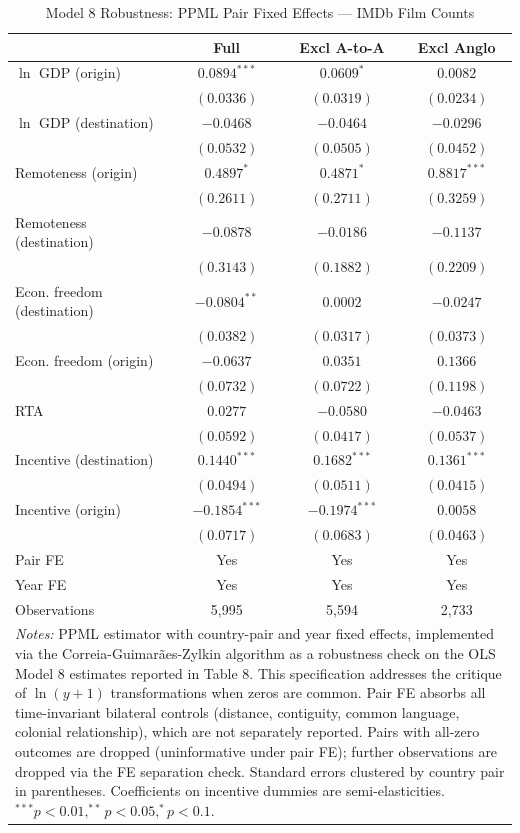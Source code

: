 \begin{table}[ht]
\centering\small
\caption{Model 8 Robustness: PPML Pair Fixed Effects --- IMDb Film Counts}
\label{tab:m8_ppml_robustness}
\begin{tabular}{lccc}
\hline\hline
 & Full & Excl A-to-A & Excl Anglo \\
\hline
$\ln$ GDP (origin) & $0.0894^{***}$ & $0.0609^{*}$ & $0.0082$ \\
 & $(0.0336)$ & $(0.0319)$ & $(0.0234)$ \\
$\ln$ GDP (destination) & $-0.0468$ & $-0.0464$ & $-0.0296$ \\
 & $(0.0532)$ & $(0.0505)$ & $(0.0452)$ \\
Remoteness (origin) & $0.4897^{*}$ & $0.4871^{*}$ & $0.8817^{***}$ \\
 & $(0.2611)$ & $(0.2711)$ & $(0.3259)$ \\
Remoteness (destination) & $-0.0878$ & $-0.0186$ & $-0.1137$ \\
 & $(0.3143)$ & $(0.1882)$ & $(0.2209)$ \\
Econ. freedom (destination) & $-0.0804^{**}$ & $0.0002$ & $-0.0247$ \\
 & $(0.0382)$ & $(0.0317)$ & $(0.0373)$ \\
Econ. freedom (origin) & $-0.0637$ & $0.0351$ & $0.1366$ \\
 & $(0.0732)$ & $(0.0722)$ & $(0.1198)$ \\
RTA & $0.0277$ & $-0.0580$ & $-0.0463$ \\
 & $(0.0592)$ & $(0.0417)$ & $(0.0537)$ \\
Incentive (destination) & $0.1440^{***}$ & $0.1682^{***}$ & $0.1361^{***}$ \\
 & $(0.0494)$ & $(0.0511)$ & $(0.0415)$ \\
Incentive (origin) & $-0.1854^{***}$ & $-0.1974^{***}$ & $0.0058$ \\
 & $(0.0717)$ & $(0.0683)$ & $(0.0463)$ \\
\hline
Pair FE & Yes & Yes & Yes \\
Year FE & Yes & Yes & Yes \\
Observations & 5,995 & 5,594 & 2,733 \\
\hline\hline
\multicolumn{4}{p{0.95\textwidth}}{\footnotesize 
\textit{Notes:} PPML estimator with country-pair and year fixed effects, 
implemented via the Correia-Guimar\~aes-Zylkin algorithm \citep{correia2020fast} 
as a robustness check on the OLS Model 8 estimates reported in Table 8. This 
specification addresses the \citet{chen2024logs} critique of $\ln(y+1)$ 
transformations when zeros are common. Pair FE absorbs all time-invariant 
bilateral controls (distance, contiguity, common language, colonial 
relationship), which are not separately reported. Pairs with all-zero outcomes 
are dropped (uninformative under pair FE); further observations are dropped via 
the FE separation check. Standard errors clustered by country pair in 
parentheses. Coefficients on incentive dummies are semi-elasticities. 
$^{***}p<0.01, ^{**}p<0.05, ^{*}p<0.1$.}
\end{tabular}
\end{table}